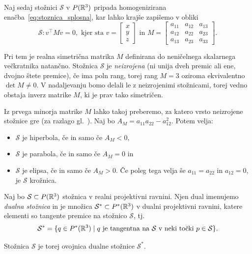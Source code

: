Naj sedaj stožnici $\mathcal{S}$ v $P(\mathbb R^3)$ pripada homogenizirana enačba~\ref{eq:stoznica_splosna}, kar lahko krajše zapišemo v obliki
\begin{equation}
    \label{eq:stoznica_matricna}
    \mathcal{S}: v^\intercal M v = 0,
    \text{ kjer sta } v =
    \begin{bmatrix}
        x\\
        y\\
        z
    \end{bmatrix}
    \text{ in } M =
    \begin{bmatrix}
        a_{11} & a_{12} & a_{13}\\
        a_{12} & a_{22} & a_{23}\\
        a_{13} & a_{23} & a_{33}
    \end{bmatrix}.
\end{equation}

Pri tem je realna simetrična matrika $M$ definirana do neničelnega skalarnega večkratnika natančno. Stožnica $\mathcal{S}$ je \emph{neizrojena} (ni unija dveh premic ali ene, dvojno štete premice), če ima poln rang, torej rang $ M = 3$ oziroma ekvivalentno $\det M \neq 0$. V nadaljevanju bomo delali le z neizrojenimi stožnicami, torej vedno obstaja inverz matrike $M$, ki je prav tako simetričen.

Iz prvega minorja matrike $M$ lahko takoj preberemo, za katero vrsto neizrojene stožnice gre (za razlago gl.\ \cite{sivic2020}). Naj bo $A_M = a_{11}a_{22} - a_{12}^2$. Potem velja:
\begin{itemize}
    \item $\mathcal{S}$ je hiperbola, če in samo če $A_M < 0$,
    \item $\mathcal{S}$ je parabola, če in samo če $A_M = 0$ in
    \item $\mathcal{S}$ je elipsa, če in samo če $A_M > 0$. Če poleg tega velja še $a_{11} = a_{22}$ in $a_{12} = 0$, je $\mathcal{S}$ krožnica.
\end{itemize}

\begin{definicija}
    Naj bo $\mathcal{S} \subset P(\mathbb R^3)$ stožnica v realni projektivni ravnini. Njen dual imenujemo \emph{dualna stožnica} in je množica $\mathcal{S}^* \subset P^*(\mathbb R^3)$ v dualni projektivni ravnini, katere elementi so tangente premice na stožnico $\mathcal{S}$, tj.\
    $$ \mathcal{S}^* = \{ q \in P^*(\mathbb R^3) \; | \; q \text{ je tangentna na } \mathcal{S} \text{ v neki točki } p \in \mathcal{S} \}.$$
\end{definicija}
\begin{opomba}
    Stožnica $\mathcal{S}$ je torej ovojnica dualne stožnice $\mathcal{S}^*$.
\end{opomba}

